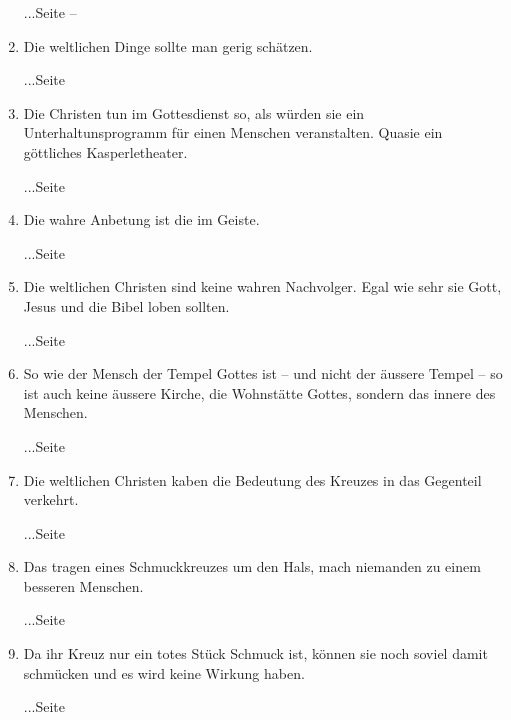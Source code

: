 \begin{enumerate}
 \begin{flushright}...Seite \pageref{ref:04_23_innere_stimme} -- \pageref{ref:04_23_innere_stimme_ende}\end{flushright}
 \item Die weltlichen Dinge sollte man gerig schätzen.
 \begin{flushright}...Seite \pageref{ref:04_23_dinge_der_welt}\end{flushright}
 \item Die Christen tun im Gottesdienst so, als würden sie ein Unterhaltunsprogramm
 für einen Menschen veranstalten. Quasie ein göttliches Kasperletheater.
 \begin{flushright}...Seite \pageref{ref:05_02_kasperletheater}\end{flushright}
 \item Die wahre Anbetung ist die im Geiste.
 \begin{flushright}...Seite \pageref{ref:05_04_wahre_anbetung}\end{flushright}
 \item Die weltlichen Christen sind keine wahren Nachvolger. Egal wie sehr sie Gott, Jesus und die Bibel loben sollten.
 \begin{flushright}...Seite \pageref{ref:05_05_wahre_nachfolge}\end{flushright}
 \item So wie der Mensch der Tempel Gottes ist -- und nicht der äussere Tempel --
 so ist auch keine äussere Kirche, die Wohnstätte Gottes, sondern das innere des Menschen.
 \begin{flushright}...Seite \pageref{ref:05_06_tempel}\end{flushright}
 \item Die weltlichen Christen kaben die Bedeutung des Kreuzes in das Gegenteil verkehrt.
 \begin{flushright}...Seite \pageref{ref:05_07_kreuz}\end{flushright}
 \item Das tragen eines Schmuckkreuzes um den Hals, mach niemanden zu einem besseren Menschen.
 \begin{flushright}...Seite \pageref{ref:05_08_kreuz}\end{flushright}
 \item Da ihr Kreuz nur ein totes Stück Schmuck ist, können sie noch soviel damit schmücken und es wird keine Wirkung haben.
 \begin{flushright}...Seite \pageref{ref:05_09_kreuz}\end{flushright}

\end{enumerate}
